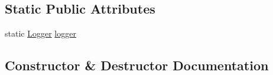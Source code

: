 \subsection*{Static Public Attributes}
\begin{DoxyCompactItemize}
\item 
static \hyperlink{classtools_1_1Logger}{Logger} \hyperlink{classtools_1_1Logger_a341eaab3865b60362db6736c2e2b7c68}{logger}
\end{DoxyCompactItemize}


\subsection{Constructor \& Destructor Documentation}
\hypertarget{classtools_1_1Logger_a9e1e0651776fcc78f89a1a1dcf339249}{
}
